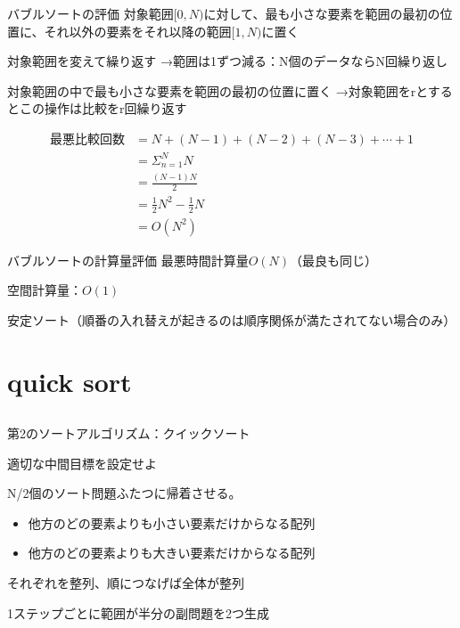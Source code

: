 \documentclass{beamer}
\begin{document}
\begin{frame}[fragile]{バブルソートの評価}{}
対象範囲$[0, N)$に対して、最も小さな要素を範囲の最初の位置に、それ以外の要素をそれ以降の範囲$[1, N)$に置く

対象範囲を変えて繰り返す
→範囲は1ずつ減る：N個のデータならN回繰り返し


対象範囲の中で最も小さな要素を範囲の最初の位置に置く
→対象範囲をrとするとこの操作は比較をr回繰り返す

\begin{align*}
最悪比較回数 &= N + (N - 1) + (N - 2) + (N - 3) + \cdots + 1 \\
&= \Sigma_{n=1}^{N}N \\
&= \frac{(N-1)N}{2} \\
&= \frac{1}{2}N^2 - \frac{1}{2}N \\
&= O(N^2)
\end{align*}

\end{frame}

\begin{frame}[fragile]{バブルソートの計算量評価}{}
最悪時間計算量$O(N)$（最良も同じ）

\vfill
空間計算量：$O(1)$

\vfill
安定ソート（順番の入れ替えが起きるのは順序関係が満たされてない場合のみ）
\end{frame}

\section{quick sort}		%
\subsection{}

\begin{frame}[fragile]{第2のソートアルゴリズム：クイックソート}{}

\vfill
適切な中間目標を設定せよ

\vfill
N/2個のソート問題ふたつに帰着させる。

\begin{itemize}%
\item 他方のどの要素よりも小さい要素だけからなる配列
\item 他方のどの要素よりも大きい要素だけからなる配列
\end{itemize}
それぞれを整列、順につなげば全体が整列


\vfill
1ステップごとに範囲が半分の副問題を2つ生成
\end{frame}
\end{document}

